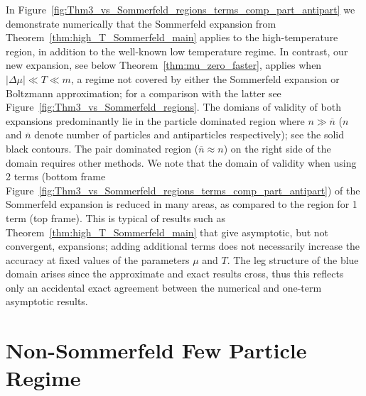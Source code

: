 \documentclass[sn-mathphys,Numbered]{sn-jnl}
\newcommand{\rf}[1]{Figure~{\ref{#1}}}
\newcommand{\rTh}[1]{Theorem~{\ref{#1}}}
\begin{document}
In  \rf{fig:Thm3_vs_Sommerfeld_regions_terms_comp_part_antipart} we demonstrate numerically that the Sommerfeld expansion from \rTh{thm:high_T_Sommerfeld_main} applies to the high-temperature region, in addition to the well-known low temperature regime.  In contrast, our new expansion, see below \rTh{thm:mu_zero_faster}, applies when $|\Delta\mu|\ll T\ll m$, a regime not covered by either the Sommerfeld expansion or Boltzmann approximation; for a comparison with the latter see   \rf{fig:Thm3_vs_Sommerfeld_regions}. The domians of validity of both expansions  predominantly lie in the particle dominated region where $n\gg \overline{n}$ ($n$ and $\overline{n}$ denote number of particles and antiparticles respectively); see the solid black contours. The pair dominated region ($\overline{n}\approx n$) on the right side of the domain requires other methods. We note that the domain of validity when using 2 terms (bottom frame \rf{fig:Thm3_vs_Sommerfeld_regions_terms_comp_part_antipart}) of the Sommerfeld expansion is reduced in many areas, as compared to the region for 1 term (top frame). This is typical of results such as \rTh{thm:high_T_Sommerfeld_main} that give asymptotic, but not convergent, expansions; adding additional terms does not necessarily increase the accuracy at fixed values of the parameters $\mu$ and $T$. The leg structure of the blue domain arises since the approximate and exact results cross, thus this reflects only an accidental exact agreement between the numerical  and one-term asymptotic results. 









\section{Non-Sommerfeld Few Particle Regime}\label{sec:beyondSommer}
\end{document}

